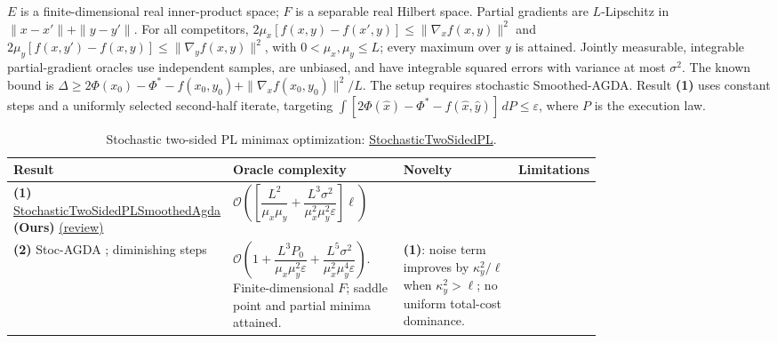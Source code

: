 \begin{table}[tp]
\centering
\caption{Stochastic two-sided PL minimax optimization: \href{https://github.com/k3nfalt/longtails/blob/main/LongTails/Setups/StochasticTwoSidedPL.lean}{StochasticTwoSidedPL}.}\label{tab:StochasticTwoSidedPL}
\parbox{\linewidth}{\footnotesize
$E$ is a finite-dimensional real inner-product space; $F$ is a separable real Hilbert space. Partial gradients are $L$-Lipschitz in $\|x-x'\|+\|y-y'\|$. For all competitors, $2\mu_x[f(x,y)-f(x',y)]\le\|\nabla_x f(x,y)\|^2$ and $2\mu_y[f(x,y')-f(x,y)]\le\|\nabla_y f(x,y)\|^2$, with $0<\mu_x,\mu_y\le L$; every maximum over $y$ is attained. Jointly measurable, integrable partial-gradient oracles use independent samples, are unbiased, and have integrable squared errors with variance at most $\sigma^2$. The known bound is $\Delta\ge 2\Phi(x_0)-\Phi^*-f(x_0,y_0)+\|\nabla_x f(x_0,y_0)\|^2/L$. The setup requires stochastic Smoothed-AGDA. Result \textbf{(1)} uses constant steps and a uniformly selected second-half iterate, targeting $\int[2\Phi(\hat x)-\Phi^*-f(\hat x,\hat y)]\,dP\le\varepsilon$, where $P$ is the execution law.}\par\smallskip
\begin{threeparttable}
\footnotesize
\setlength{\tabcolsep}{4pt}\renewcommand{\arraystretch}{1.25}
\begin{tabularx}{\linewidth}{@{}>{\raggedright\arraybackslash}p{0.20\linewidth}>{\raggedright\arraybackslash}p{0.32\linewidth}>{\raggedright\arraybackslash}p{0.25\linewidth}>{\raggedright\arraybackslash}X@{}}
\toprule
\textbf{Result} & \textbf{Oracle complexity} & \textbf{Novelty} & \textbf{Limitations} \\
\midrule
\textbf{(1)} \href{https://github.com/k3nfalt/longtails/blob/main/LongTails/Theorems/StochasticTwoSidedPLSmoothedAgda.lean}{Stochastic\allowbreak Two\allowbreak Sided\allowbreak PL\allowbreak Smoothed\allowbreak Agda} \textbf{(Ours)} \href{https://github.com/k3nfalt/longtails/blob/main/scripts/reviews/StochasticTwoSidedPLSmoothedAgda.md}{(review)}
& $\mathcal{O}\!\left(\left[\dfrac{L^2}{\mu_x\mu_y}+\dfrac{L^3\sigma^2}{\mu_x^2\mu_y^2\varepsilon}\right]\ell\right)$ & & \\
\midrule[1.2pt]
\textbf{(2)} Stoc-AGDA \citep[Theorem 3.3]{stplYang2020}; diminishing steps
& $\mathcal{O}\!\left(1+\dfrac{L^3P_0}{\mu_x\mu_y^2\varepsilon}+\dfrac{L^5\sigma^2}{\mu_x^2\mu_y^4\varepsilon}\right)$.
Finite-dimensional $F$; saddle point and partial minima attained.
& \textbf{(1)}: noise term improves by $\kappa_y^2/\ell$ when $\kappa_y^2>\ell$; no uniform total-cost dominance.

\end{tabularx}
\end{threeparttable}
\end{table}
